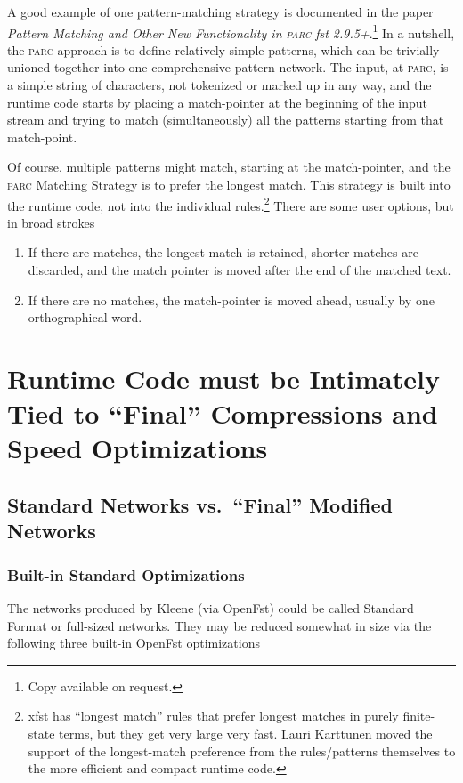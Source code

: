\documentclass[letterpaper,12pt]{article}
\providecommand{\acro}{}\renewcommand{\acro}{\textsc}
\begin{document}
A good example of one pattern-matching strategy is documented in the paper \emph{Pattern
Matching and Other New Functionality in \acro{parc} fst 2.9.5+}.\footnote{Copy available on request.}
In a nutshell, the \acro{parc} approach is to define relatively simple patterns, which can be
trivially unioned together into one comprehensive pattern network.  The
input, at \acro{parc}, is
a simple string of characters, not tokenized or marked up in any way, 
and the runtime code starts by placing a
match-pointer at the beginning of the input stream and trying to match (simultaneously) all the
patterns starting from that match-point.

Of course, multiple patterns might match, starting at the match-pointer, and the \acro{parc}
Matching Strategy is to prefer the longest match.  This strategy is built into the runtime code,
not into the individual rules.\footnote{xfst has ``longest match'' rules that prefer longest
matches in purely finite-state terms, but they get very large very fast.  Lauri Karttunen moved
the support of the longest-match preference from the rules/patterns themselves to the more
efficient and compact runtime code.}  There are some user options, but in broad strokes

\begin{enumerate}
\item
If there are matches, the longest match is retained, shorter matches are discarded, and the
match pointer is moved after the end of the matched text.
\item
If there are no matches, the match-pointer is moved ahead, usually by one orthographical word.
\end{enumerate}

\section{Runtime Code must be Intimately Tied to ``Final'' Compressions and Speed Optimizations}

\subsection{Standard Networks vs.~``Final'' Modified Networks}

\subsubsection{Built-in Standard Optimizations}

The networks produced by Kleene (via OpenFst) could be called Standard Format or full-sized networks.
They may be reduced somewhat in size via the following three built-in OpenFst optimizations 
\end{document}
